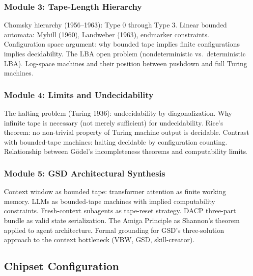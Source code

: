 \documentclass[11pt,letterpaper]{article}
\begin{document}
\subsubsection{Module 3: Tape-Length Hierarchy}
Chomsky hierarchy (1956--1963): Type 0 through Type 3. Linear bounded automata: Myhill (1960), Landweber (1963), endmarker constraints. Configuration space argument: why bounded tape implies finite configurations implies decidability. The LBA open problem (nondeterministic vs.\ deterministic LBA). Log-space machines and their position between pushdown and full Turing machines.

\subsubsection{Module 4: Limits and Undecidability}
The halting problem (Turing 1936): undecidability by diagonalization. Why infinite tape is necessary (not merely sufficient) for undecidability. Rice's theorem: no non-trivial property of Turing machine output is decidable. Contrast with bounded-tape machines: halting decidable by configuration counting. Relationship between G\"{o}del's incompleteness theorems and computability limits.

\subsubsection{Module 5: GSD Architectural Synthesis}
Context window as bounded tape: transformer attention as finite working memory. LLMs as bounded-tape machines with implied computability constraints. Fresh-context subagents as tape-reset strategy. DACP three-part bundle as valid state serialization. The Amiga Principle as Shannon's theorem applied to agent architecture. Formal grounding for GSD's three-solution approach to the context bottleneck (VBW, GSD, skill-creator).

\subsection{Chipset Configuration}
\end{document}
